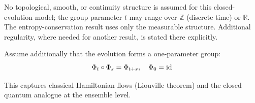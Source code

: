 No topological, smooth, or continuity structure is assumed for this
closed-evolution model; the group parameter $t$ may range over
$\mathbb{Z}$ (discrete time) or $\mathbb{R}$. The entropy-conservation
result uses only the measurable structure. Additional regularity, where
needed for another result, is stated there explicitly.

Assume additionally that the evolution forms a one-parameter group:
\begin{equation}
  \Phi_t \circ \Phi_s = \Phi_{t+s}, \quad \Phi_0 = \mathrm{id}\label{eq:evolution-group}
\end{equation}

This captures classical Hamiltonian flows (Liouville theorem) and the closed
quantum analogue at the ensemble level.



